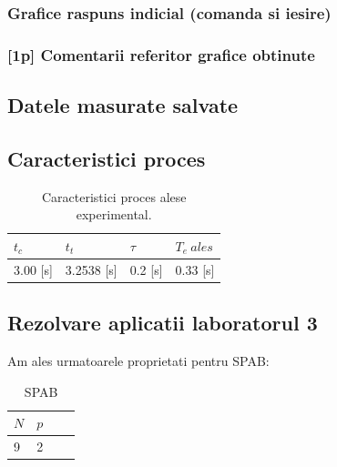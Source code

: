 \documentclass[12pt,english]{article}
\begin{document}
\subsubsection {Grafice raspuns indicial (comanda si iesire) }
	\begin{center}
	\end{center}

\subsubsection {[1p] Comentarii referitor grafice obtinute }
\subsection {Datele masurate salvate }
\subsection {Caracteristici proces }
\begin{table}[H]
  \centering
  \begin{tabular}{|l|l|l|l|}
    \hline
    $t_c$ & $t_t$ & $\tau$ & $T_e\ ales$ \\
    \hline
    3.00 [s] & 3.2538 [s] & 0.2 [s] & 0.33 [s] \\
    \hline
  \end{tabular}
  \caption{Caracteristici proces alese experimental.}
\end{table}

\subsection {Rezolvare aplicatii laboratorul 3 }
Am ales urmatoarele proprietati pentru SPAB:
\begin{table}[h!]
  \centering
    \begin{tabular}{|l|l|l|l|}
      \hline
      $N$ & $p$ \\
      \hline
      9 & 2 \\
      \hline
    \end{tabular}
    \caption{SPAB}
\end{table}
\end{document}
